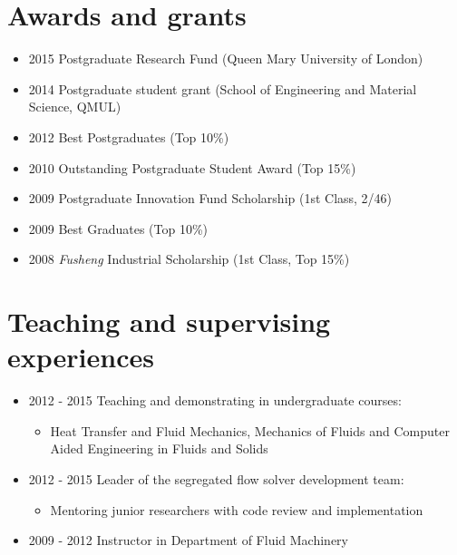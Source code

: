 \documentclass[letterpaper]{article}
\begin{document}
\vspace{-12pt}
\section*{Awards and grants}
\vspace{-10pt}
\begin{itemize}
\item 2015 Postgraduate Research Fund (Queen Mary University of London)
\item 2014 Postgraduate student grant (School of Engineering and Material Science, QMUL)
\item 2012 Best Postgraduates (Top 10\%)
\item 2010 Outstanding Postgraduate Student Award (Top 15\%)
\item 2009 Postgraduate Innovation Fund Scholarship (1st Class, 2/46)
\item 2009 Best Graduates (Top 10\%)
\item 2008 \textsl{Fusheng} Industrial Scholarship (1st Class, Top 15\%)
\end{itemize}

\vspace{-12pt}
\section*{Teaching and supervising experiences}
\vspace{-10pt}

\begin{itemize}
\item	2012 - 2015  \hspace{2pt} Teaching and demonstrating in undergraduate courses:
			\begin{itemize}
			\item Heat Transfer and Fluid Mechanics, Mechanics of Fluids and Computer Aided Engineering in Fluids and Solids
			\end{itemize}

\item 2012 - 2015 \hspace{2pt} Leader of the segregated flow solver development team:
		\begin{itemize}
		\item Mentoring junior researchers with code review and implementation
		\end{itemize} 
\item	2009 - 2012  \hspace{2pt} Instructor in Department of Fluid Machinery
\end{itemize}

\end{document}
